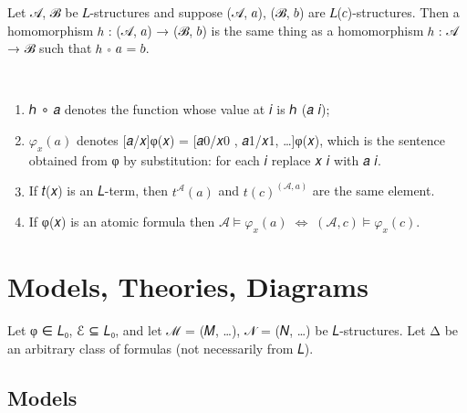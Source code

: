 \documentclass[a4paper,UKenglish,cleveref,autoref,thm-restate,12pt]{lipics-v2021-wjd}
\newcommand{\<}{\langle}
\renewcommand{\>}{\rangle}
\begin{document}
\begin{lemma} Let 𝒜, ℬ be 𝐿-structures and
  suppose (𝒜, 𝑎), (ℬ, 𝑏) are 𝐿(𝑐)-structures. Then a homomorphism 
  ℎ : (𝒜, 𝑎) → (ℬ, 𝑏) is the same thing as a homomorphism ℎ : 𝒜 → ℬ
  such that ℎ ∘ 𝑎 = 𝑏.
\end{lemma}
\begin{remarks*}\
\begin{enumerate}
\item 
  ℎ ∘ 𝑎 denotes the function whose value at 𝑖 is ℎ (𝑎 𝑖);
\item \(φ_x(𝑎)\) denotes [𝑎/𝑥]φ(𝑥) = [𝑎0/𝑥0 , 𝑎1/𝑥1, …]φ(𝑥), which is the sentence
  obtained from φ by substitution: for each 𝑖 replace 𝑥 𝑖 with 𝑎 𝑖.
\item 
  If 𝑡(𝑥) is an 𝐿-term, then \(t^𝒜 (𝑎)\) and \(t(𝑐)^{(𝒜, 𝑎)}\) are the same
  element.
\item
  If φ(𝑥) is an atomic formula then \(𝒜 \models φ_x(𝑎) \; ⇔ \; (𝒜, 𝑐) \models φ_x(𝑐)\).
\end{enumerate}
\end{remarks*}

\section{Models, Theories, Diagrams}\label{models-theories-diagrams}

Let φ ∈ 𝐿₀, ℰ ⊆ 𝐿₀, and let ℳ = (𝑀, …), 𝒩 = (𝑁, …) be 𝐿-structures. Let Δ be an
arbitrary class of formulas (not necessarily from 𝐿).

\subsection{Models}\label{models}
\end{document}
